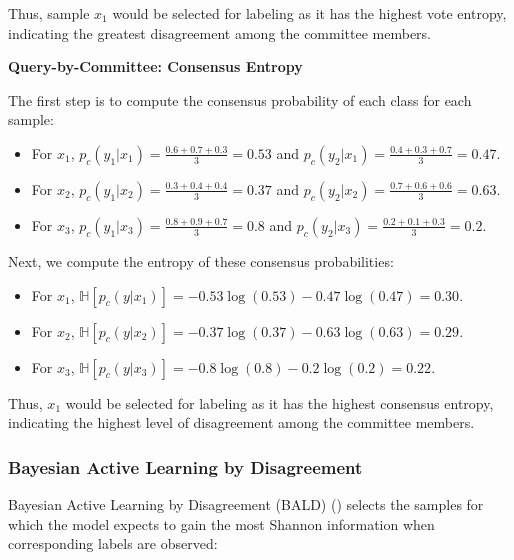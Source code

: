 \documentclass[
  letterpaper,
  numbers=noenddot,
  DIV=11]{scrreprt}
\providecommand{\tightlist}{%
  \setlength{\itemsep}{0pt}\setlength{\parskip}{0pt}}\usepackage{longtable,booktabs,array}
\theoremstyle{plain}
\theoremstyle{definition}
\theoremstyle{plain}
\theoremstyle{remark}
\begin{document}
Thus, sample \(x_1\) would be selected for labeling as it has the
highest vote entropy, indicating the greatest disagreement among the
committee members.

\textbf{Query-by-Committee: Consensus Entropy}

The first step is to compute the consensus probability of each class for
each sample:

\begin{itemize}
\tightlist
\item
  For \(x_1\), \(p_c(y_1|x_1) = \frac{0.6 + 0.7 + 0.3}{3} = 0.53\) and
  \(p_c(y_2|x_1) = \frac{0.4 + 0.3 + 0.7}{3} = 0.47\).
\item
  For \(x_2\), \(p_c(y_1|x_2) = \frac{0.3 + 0.4 + 0.4}{3} = 0.37\) and
  \(p_c(y_2|x_2) = \frac{0.7 + 0.6 + 0.6}{3} = 0.63\).
\item
  For \(x_3\), \(p_c(y_1|x_3) = \frac{0.8 + 0.9 + 0.7}{3} = 0.8\) and
  \(p_c(y_2|x_3) = \frac{0.2 + 0.1 + 0.3}{3} = 0.2\).
\end{itemize}

Next, we compute the entropy of these consensus probabilities:

\begin{itemize}
\tightlist
\item
  For \(x_1\),
  \(\mathbb{H}[p_c(y|x_1)] = -0.53 \log (0.53) - 0.47 \log (0.47) = 0.30\).
\item
  For \(x_2\),
  \(\mathbb{H}[p_c(y|x_2)] = -0.37 \log (0.37) - 0.63 \log (0.63) = 0.29\).
\item
  For \(x_3\),
  \(\mathbb{H}[p_c(y|x_3)] = -0.8 \log (0.8) - 0.2 \log (0.2) = 0.22\).
\end{itemize}

Thus, \(x_1\) would be selected for labeling as it has the highest
consensus entropy, indicating the highest level of disagreement among
the committee members.

\subsubsection*{Bayesian Active Learning by
Disagreement}\label{bayesian-active-learning-by-disagreement}

Bayesian Active Learning by Disagreement (BALD)
() selects the samples for
which the model expects to gain the most Shannon information when
corresponding labels are observed:
\end{document}

